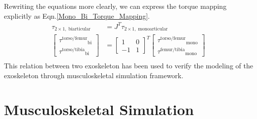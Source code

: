 \documentclass[10pt,letterpaper]{article}
\begin{document}
Rewriting the equations more clearly, we can express the torque mapping explicitly as Eqn.\ref{Mono_Bi_Torque_Mapping}.
\begin{equation}\label{Mono_Bi_Torque_Mapping}
\begin{aligned}
\tau_{2\times 1,\;\mathrm{biarticular}} &=J^T \tau_{2\times 1,\;\mathrm{monoarticular}}\\
\left\lbrack \begin{array}{c}
{\tau^{\mathrm{torso}/\mathrm{femur}} }_{\mathrm{bi}} \\
{\tau^{\mathrm{torso}/\mathrm{tibia}} }_{\mathrm{bi}} 
\end{array}\right\rbrack &={\left\lbrack \begin{array}{cc}
	1 & 0\\
	-1 & 1
	\end{array}\right\rbrack }^T \left\lbrack \begin{array}{c}
{\tau^{\mathrm{torso}/\mathrm{femur}} }_{\mathrm{mono}} \\
{\tau^{\mathrm{femur}/\mathrm{tibia}} }_{\mathrm{mono}} 
\end{array}\right\rbrack\\
\end{aligned}
\end{equation}
This relation between two exoskeleton has been used to verify the modeling of the exoskeleton through musculoskeletal simulation framework.
\section*{\textbf{Musculoskeletal Simulation}}
\end{document}
